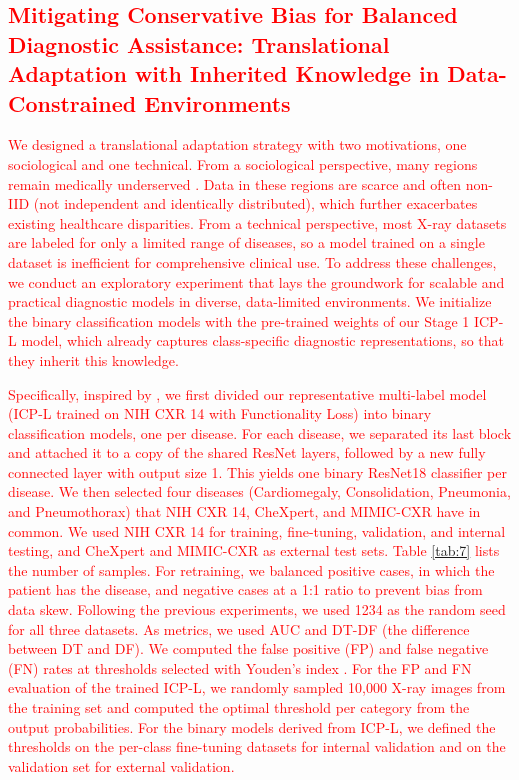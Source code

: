 \documentclass[preprint,7pt, a4paper]{elsarticle}
\begin{document}
\subsection{\textcolor{red}{Mitigating Conservative Bias for Balanced Diagnostic Assistance: Translational Adaptation with Inherited Knowledge in Data-Constrained Environments}}
\label{exp:5.4}
\textcolor{black}{\textcolor{red}{We designed a translational adaptation strategy with two motivations, one sociological and one technical. From a sociological perspective, many regions remain medically underserved \cite{81}. Data in these regions are scarce and often non-IID (not independent and identically distributed), which further exacerbates existing healthcare disparities. From a technical perspective, most X-ray datasets are labeled for only a limited range of diseases, so a model trained on a single dataset is inefficient for comprehensive clinical use. To address these challenges, we conduct an exploratory experiment that lays the groundwork for scalable and practical diagnostic models in diverse, data-limited environments. We initialize the binary classification models with the pre-trained weights of our Stage 1 ICP-L model, which already captures class-specific diagnostic representations, so that they inherit this knowledge.}}

\textcolor{black}{\textcolor{red}{Specifically, inspired by \cite{78, 79}, we first divided our representative multi-label model (ICP-L trained on NIH CXR 14 with Functionality Loss) into binary classification models, one per disease. For each disease, we separated its last block and attached it to a copy of the shared ResNet layers, followed by a new fully connected layer with output size 1. This yields one binary ResNet18 classifier per disease. We then selected four diseases (Cardiomegaly, Consolidation, Pneumonia, and Pneumothorax) that NIH CXR 14, CheXpert, and MIMIC-CXR have in common. We used NIH CXR 14 for training, fine-tuning, validation, and internal testing, and CheXpert and MIMIC-CXR as external test sets. Table \ref{tab:7} lists the number of samples. For retraining, we balanced positive cases, in which the patient has the disease, and negative cases at a 1:1 ratio to prevent bias from data skew. Following the previous experiments, we used 1234 as the random seed for all three datasets. As metrics, we used AUC and DT-DF (the difference between DT and DF). We computed the false positive (FP) and false negative (FN) rates at thresholds selected with Youden's index \cite{80}. For the FP and FN evaluation of the trained ICP-L, we randomly sampled 10,000 X-ray images from the training set and computed the optimal threshold per category from the output probabilities. For the binary models derived from ICP-L, we defined the thresholds on the per-class fine-tuning datasets for internal validation and on the validation set for external validation.}}
\end{document}
